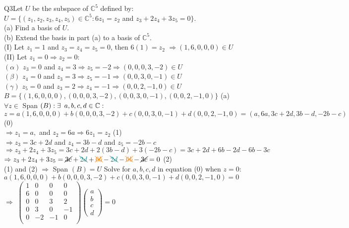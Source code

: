 \documentclass{article}
\begin{document}
Q3\quad Let $U$ be the subspace of $\mathbb{C}^5$ defined by:\\
$U = \{(z_1 , z_2 , z_3 , z_4 , z_5) \in \mathbb{C}^5 : 6z_1 = z_2$ and
$
z_3 + 2z_4 + 3z_5 = 0\}$.\\
(a) Find a basis of $U$.\\
(b) Extend the basis in part (a) to a basis of $\mathbb{C}^5$.\\

(I) Let $z_1 = 1$ and $z_3 = z_4 = z_5 = 0$, then $6(1) = z_2$ $\Rightarrow (1,6,0,0,0) \in U$\\
(II) Let $z_1 = 0 \Rightarrow z_2 = 0$:\\
$(\alpha)$ $z_3=0$ and $z_4 = 3 \Rightarrow z_5 = -2 \Rightarrow (0,0,0,3,-2) \in U$\\
$(\beta)$ $z_4=0$ and $z_3 = 3 \Rightarrow z_5 = -1 \Rightarrow
(0,0,3,0,-1) \in U$\\
$(\gamma)$ $z_5=0$ and $z_3 = 2 \Rightarrow z_4 = -1 \Rightarrow
(0,0,2,-1,0) \in U$\\

$B = \{(1,6,0,0,0),(0,0,0,3,-2),(0,0,3,0,-1),(0,0,2,-1,0)\}$ (a)\\

$\forall z \in$ Span $(B): \exists\enskip a,b,c,d \in \mathbb{C}:$\\
$ z = a(1,6,0,0,0) + b(0,0,0,3,-2) + c(0,0,3,0,-1) +
d(0,0,2,-1,0) = (a,6a,3c+2d,3b-d,-2b-c)$ (0) \\

$\Rightarrow z_1=a,$ and $z_2=6a \Rightarrow 6z_1=z_2$ (1)\\

$\Rightarrow z_3 = 3c+2d$ and $z_4=3b-d$ and $z_5=-2b-c$\\
$\Rightarrow z_3 + 2z_4 + 3z_5 = 3c+2d + 2(3b-d) + 3(-2b-c) = 3c + 2d + 6b -2d -6b -3c$\\
$\Rightarrow z_3 + 2z_4 + 3z_5 = \cancel{3c} + \color{teal}\bcancel{2d}\color{black}
+\color{orange} \xcancel{6b} \color{black} -\color{teal}\bcancel{2d}\color{black}
-\color{orange}\xcancel{6b}\color{black} -\cancel{3c} = 0$ (2)\\

(1) and (2) $\Rightarrow$ Span $(B) = U$
\newpage
Solve for $a,b,c,d$ in equation (0) when $z = 0$:\\
$a(1,6,0,0,0) + b(0,0,0,3,-2) + c(0,0,3,0,-1) +
d(0,0,2,-1,0) = 0$\\
$\Rightarrow$
$\begin{pmatrix}
  1&0&0&0\\
  6&0&0&0\\
  0&0&3&2\\
  0&3&0&-1\\
  0&-2&-1&0\\
\end{pmatrix}
\begin{pmatrix}
  a\\b\\c\\d
\end{pmatrix} = 0$\\
\end{document}
